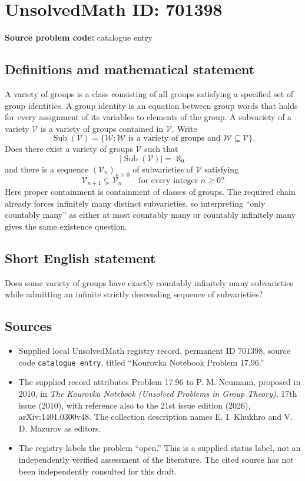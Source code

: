 \documentclass[11pt]{article}
\begin{document}
\section*{UnsolvedMath ID: 701398}
\textbf{Source problem code:} catalogue entry
\subsection{Definitions and mathematical statement}
A variety of groups is a class consisting of all groups satisfying a specified set of group identities. A group identity is an equation between group words that holds for every assignment of its variables to elements of the group. A subvariety of a variety \(\mathcal V\) is a variety of groups contained in \(\mathcal V\). Write
\[
\operatorname{Sub}(\mathcal V)=\{\mathcal W: \mathcal W\text{ is a variety of groups and }\mathcal W\subseteq\mathcal V\}.
\]
Does there exist a variety of groups \(\mathcal V\) such that
\[
\lvert\operatorname{Sub}(\mathcal V)\rvert=\aleph_0
\]
and there is a sequence \((\mathcal V_n)_{n\geq 0}\) of subvarieties of \(\mathcal V\) satisfying
\[
\mathcal V_{n+1}\subsetneq\mathcal V_n\qquad\text{for every integer }n\geq 0?
\]
Here proper containment is containment of classes of groups. The required chain already forces infinitely many distinct subvarieties, so interpreting ``only countably many'' as either at most countably many or countably infinitely many gives the same existence question.
\subsection{Short English statement}
Does some variety of groups have exactly countably infinitely many subvarieties while admitting an infinite strictly descending sequence of subvarieties?
\subsection{Sources}
\begin{itemize}
\item Supplied local UnsolvedMath registry record, permanent ID \(701398\), source code \texttt{catalogue entry}, titled ``Kourovka Notebook Problem 17.96.''
\item The supplied record attributes Problem 17.96 to P. M. Neumann, proposed in 2010, in \emph{The Kourovka Notebook (Unsolved Problems in Group Theory)}, 17th issue (2010), with reference also to the 21st issue edition (2026), arXiv:1401.0300v48. The collection description names E. I. Khukhro and V. D. Mazurov as editors.
\item The registry labels the problem ``open.'' This is a supplied status label, not an independently verified assessment of the literature. The cited source has not been independently consulted for this draft.
\end{itemize}
\end{document}

